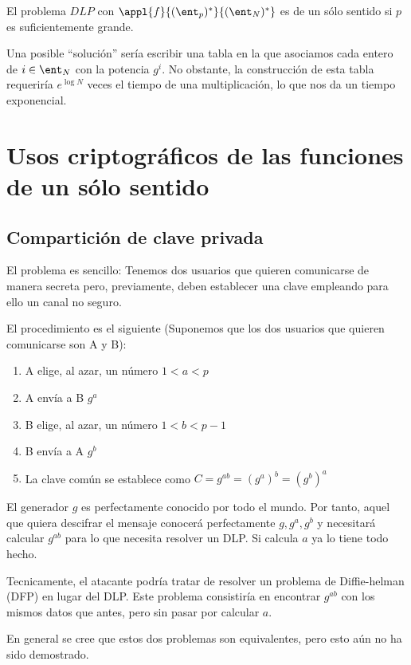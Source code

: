 \begin{corol}
El problema $DLP$ con $\appl{f}{(\ent_p)^*}{(\ent_N)^*}$ es de un sólo sentido si $p$ es suficientemente grande.
\end{corol}

Una posible ``solución'' sería escribir una tabla en la que asociamos cada entero de $i \in\ent_N$ con la potencia $g^i$. No obstante, la construcción de esta tabla requeriría $e^{\log N}$ veces el tiempo de una multiplicación, lo que nos da un tiempo exponencial.


\section{Usos criptográficos de las funciones de un sólo sentido}

\subsection{Compartición de clave privada}

El problema es sencillo: Tenemos dos usuarios que quieren comunicarse de manera secreta pero, previamente, deben establecer una clave empleando para ello un canal no seguro.

El procedimiento es el siguiente (Suponemos que los dos usuarios que quieren comunicarse son A y B):
\begin{enumerate}
\item A elige, al azar, un número $1<a<p$
\item A envía a B $g^a$
\item B elige, al azar, un número $1<b<p-1$
\item B envía a A $g^b$

\item La clave común se establece como $C=g^{ab}=(g^a)^b = (g^b)^a$
\end{enumerate}

El generador $g$ es perfectamente conocido por todo el mundo. Por tanto, aquel que quiera descifrar el mensaje conocerá perfectamente $g,g^a,g^b$ y necesitará calcular $g^{ab}$ para lo que necesita resolver un DLP. Si calcula $a$ ya lo tiene todo hecho.

Tecnicamente, el atacante podría tratar de resolver un problema de Diffie-helman (DFP) en lugar del DLP. Este problema consistiría en encontrar $g^{ab}$ con los mismos datos que antes, pero sin pasar por calcular $a$.

En general se cree que estos dos problemas son equivalentes, pero esto aún no ha sido demostrado.

